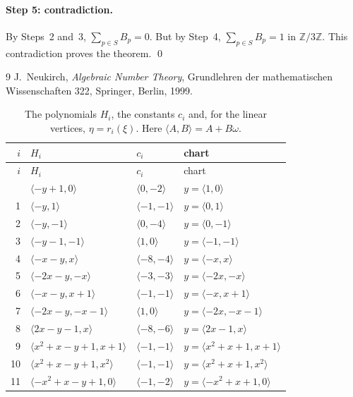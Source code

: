 \documentclass[11pt]{article}
\newcommand{\Z}{\mathbb{Z}}
\begin{document}
\paragraph{Step 5: contradiction.} By Steps~2 and~3, $\sum_{p\in S}B_p=0$. But by Step~4, $\sum_{p\in S}B_p=1$ in $\Z/3\Z$. This contradiction proves the theorem.
\qed


\begin{thebibliography}{9}
 J.~Neukirch, \emph{Algebraic Number Theory}, Grundlehren der mathematischen Wissenschaften 322, Springer, Berlin, 1999.
\end{thebibliography}

\clearpage
\begingroup\small
\setlength{\LTcapwidth}{\textwidth}
\begin{longtable}{@{}rlll@{}}
\caption{The polynomials $H_i$, the constants $c_i$ and, for the linear vertices, $\eta=r_i(\xi)$. Here $\langle A,B\rangle=A+B\omega$.}\label{tab:vert1}\\
\hline $i$ & $H_i$ & $c_i$ & chart\\\hline\endfirsthead\hline $i$ & $H_i$ & $c_i$ & chart\\\hline\endhead\hline\endfoot
0 & $\langle -y+1,0\rangle$ & $\langle 0,-2\rangle$ & $y=\langle 1,0\rangle$\\
1 & $\langle -y,1\rangle$ & $\langle -1,-1\rangle$ & $y=\langle 0,1\rangle$\\
2 & $\langle -y,-1\rangle$ & $\langle 0,-4\rangle$ & $y=\langle 0,-1\rangle$\\
3 & $\langle -y-1,-1\rangle$ & $\langle 1,0\rangle$ & $y=\langle -1,-1\rangle$\\
4 & $\langle -x-y,x\rangle$ & $\langle -8,-4\rangle$ & $y=\langle -x,x\rangle$\\
5 & $\langle -2x-y,-x\rangle$ & $\langle -3,-3\rangle$ & $y=\langle -2x,-x\rangle$\\
6 & $\langle -x-y,x+1\rangle$ & $\langle -1,-1\rangle$ & $y=\langle -x,x+1\rangle$\\
7 & $\langle -2x-y,-x-1\rangle$ & $\langle 1,0\rangle$ & $y=\langle -2x,-x-1\rangle$\\
8 & $\langle 2x-y-1,x\rangle$ & $\langle -8,-6\rangle$ & $y=\langle 2x-1,x\rangle$\\
9 & $\langle x^{2}+x-y+1,x+1\rangle$ & $\langle -1,-1\rangle$ & $y=\langle x^{2}+x+1,x+1\rangle$\\
10 & $\langle x^{2}+x-y+1,x^{2}\rangle$ & $\langle -1,-1\rangle$ & $y=\langle x^{2}+x+1,x^{2}\rangle$\\
11 & $\langle -x^{2}+x-y+1,0\rangle$ & $\langle -1,-2\rangle$ & $y=\langle -x^{2}+x+1,0\rangle$\\

\end{longtable}
\end{document}
